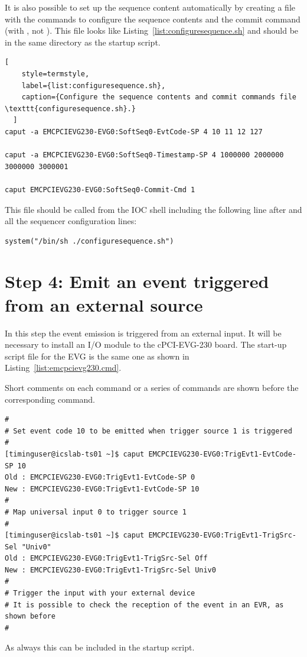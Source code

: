 \documentclass[11pt
  , a4paper
  , article
  , oneside
  , showtrims
]{memoir}
\begin{document}
It is also possible to set up the sequence content automatically by creating a file with the commands to configure the sequence contents and the commit command (with , not ). This file looks like Listing~\ref{list:configuresequence.sh} and should be in the same directory as the startup script.
\begin{lstlisting}[
    style=termstyle,
    label={list:configuresequence.sh},
    caption={Configure the sequence contents and commit commands file \texttt{configuresequence.sh}.}
  ]
caput -a EMCPCIEVG230-EVG0:SoftSeq0-EvtCode-SP 4 10 11 12 127

caput -a EMCPCIEVG230-EVG0:SoftSeq0-Timestamp-SP 4 1000000 2000000 3000000 3000001

caput EMCPCIEVG230-EVG0:SoftSeq0-Commit-Cmd 1
\end{lstlisting}

This file should be called from the IOC shell including the following line after  and all the sequencer configuration lines:
\begin{lstlisting}
system("/bin/sh ./configuresequence.sh")
\end{lstlisting}


\section{Step 4: Emit an event triggered from an external source}
In this step the event emission is triggered from an external input. It will be necessary to install an I/O module to the cPCI-EVG-230 board. The start-up script file for the EVG is the same one as shown in Listing~\ref{list:emcpcievg230.cmd}.

Short comments on each command or a series of commands are shown before the corresponding command.

\begin{lstlisting}[style=termstyle]
#
# Set event code 10 to be emitted when trigger source 1 is triggered
#
[timinguser@icslab-ts01 ~]$ caput EMCPCIEVG230-EVG0:TrigEvt1-EvtCode-SP 10
Old : EMCPCIEVG230-EVG0:TrigEvt1-EvtCode-SP 0
New : EMCPCIEVG230-EVG0:TrigEvt1-EvtCode-SP 10
#
# Map universal input 0 to trigger source 1
#
[timinguser@icslab-ts01 ~]$ caput EMCPCIEVG230-EVG0:TrigEvt1-TrigSrc-Sel "Univ0"
Old : EMCPCIEVG230-EVG0:TrigEvt1-TrigSrc-Sel Off
New : EMCPCIEVG230-EVG0:TrigEvt1-TrigSrc-Sel Univ0
#
# Trigger the input with your external device
# It is possible to check the reception of the event in an EVR, as shown before
#
\end{lstlisting}
As always this can be included in the startup script.
\end{document}
